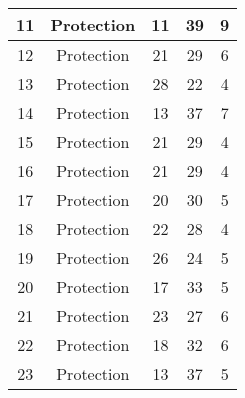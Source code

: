 \documentclass[results.tex]{subfiles}
\begin{document}
\begin{center}
\begin{tabular}{| c || c | c | c | c |}
            \hline
            11                      & Protection                   & 11                     & 39                      & 9                    \\
            \hline
            12                      & Protection                   & 21                     & 29                      & 6                    \\
            \hline
            13                      & Protection                   & 28                     & 22                      & 4                    \\
            \hline
            14                      & Protection                   & 13                     & 37                      & 7                    \\
            \hline
            15                      & Protection                   & 21                     & 29                      & 4                    \\
            \hline
            16                      & Protection                   & 21                     & 29                      & 4                    \\
            \hline
            17                      & Protection                   & 20                     & 30                      & 5                    \\
            \hline
            18                      & Protection                   & 22                     & 28                      & 4                    \\
            \hline
            19                      & Protection                   & 26                     & 24                      & 5                    \\
            \hline
            20                      & Protection                   & 17                     & 33                      & 5                    \\
            \hline
            21                      & Protection                   & 23                     & 27                      & 6                    \\
            \hline
            22                      & Protection                   & 18                     & 32                      & 6                    \\
            \hline
            23                      & Protection                   & 13                     & 37                      & 5                    \\

\end{tabular}
\end{center}
\end{document}
